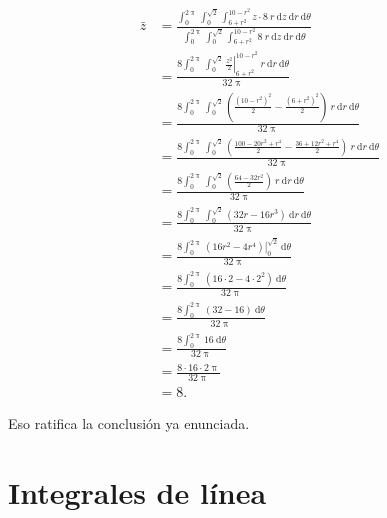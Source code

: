 \documentclass{fmbvecto}
\begin{document}
\begin{problema}
\begin{align*}
    \bar{z} &= \frac{\int_{0}^{2\uppi} \int_{0}^{\sqrt{2}} \int_{6 + r^2}^{10 - r^2} z \cdot 8 \: r \: \mathrm{d}z \: \mathrm{d}r \: \mathrm{d}\theta}{\int_{0}^{2\uppi} \int_{0}^{\sqrt{2}} \int_{6 + r^2}^{10 - r^2} 8 \: r \: \mathrm{d}z \: \mathrm{d}r \: \mathrm{d}\theta} \\
    &= \frac{8 \int_{0}^{2\uppi} \int_{0}^{\sqrt{2}} \left. \frac{z^2}{2} \right\vert_{6 + r^2}^{10 - r^2} \: r \: \mathrm{d}r \: \mathrm{d}\theta}{32\uppi} \\
    &= \frac{8 \int_{0}^{2\uppi} \int_{0}^{\sqrt{2}} \left( \frac{(10 - r^2)^2}{2} - \frac{(6 + r^2)^2}{2} \right) \: r \: \mathrm{d}r \: \mathrm{d}\theta}{32\uppi} \\
    &= \frac{8 \int_{0}^{2\uppi} \int_{0}^{\sqrt{2}} \left( \frac{100 - 20r^2 + r^4}{2} - \frac{36 + 12r^2 + r^4}{2} \right) \: r \: \mathrm{d}r \: \mathrm{d}\theta}{32\uppi} \\
    &= \frac{8 \int_{0}^{2\uppi} \int_{0}^{\sqrt{2}} \left( \frac{64 - 32r^2}{2} \right) \: r \: \mathrm{d}r \: \mathrm{d}\theta}{32\uppi} \\
    &= \frac{8 \int_{0}^{2\uppi} \int_{0}^{\sqrt{2}} (32r - 16r^3) \: \mathrm{d}r \: \mathrm{d}\theta}{32\uppi} \\
    &= \frac{8 \int_{0}^{2\uppi} \left. (16r^2 - 4r^4) \right\vert_{0}^{\sqrt{2}} \: \mathrm{d}\theta}{32\uppi} \\
    &= \frac{8 \int_{0}^{2\uppi} (16 \cdot 2 - 4 \cdot 2^2) \: \mathrm{d}\theta}{32\uppi} \\
    &= \frac{8 \int_{0}^{2\uppi} (32 - 16) \: \mathrm{d}\theta}{32\uppi} \\
    &= \frac{8 \int_{0}^{2\uppi} 16 \: \mathrm{d}\theta}{32\uppi} \\
    &= \frac{8 \cdot 16 \cdot 2\uppi}{32\uppi} \\
    &= 8.
\end{align*}

Eso ratifica la conclusión ya enunciada.

\end{problema}

\section{Integrales de línea}
\end{document}
